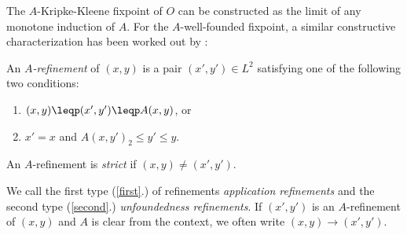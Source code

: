 % 
% 
The $A$-Kripke-Kleene fixpoint of $O$ can be constructed as the limit of any monotone induction of $A$. 
For the $A$-well-founded fixpoint, a similar constructive characterization has been worked out by \citet{lpnmr/DeneckerV07}:
 

\begin{definition}\label{002:def:refinement}
An \emph{$A$-refinement} of $(x,y)$ is a pair $(x',y')\in L^2$ satisfying one of the following two conditions:
\begin{enumerate}
	\item $(x,y)\leqp(x',y')\leqp A(x,y)$, or \label{first}
	\item $x'=x$ and  $A(x,y')_2\leq y'\leq y$. \label{second}
\end{enumerate}
An $A$-refinement is \emph{strict} if $(x,y)\neq (x',y')$.
\end{definition}

We call the first type (\ref{first}.) of refinements \emph{application refinements} and the second type (\ref{second}.) \emph{unfoundedness refinements}. If $(x',y')$ is an $A$-refinement of $(x,y)$ and $A$ is clear from the context, we often write $(x,y)\to(x',y')$.
%

